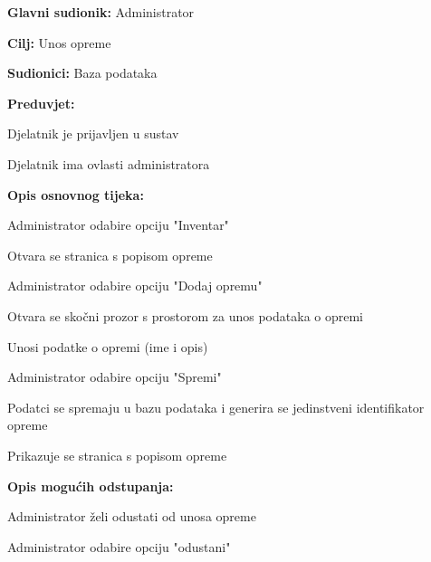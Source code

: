 					
					\noindent {}
					\begin{packed_item}
						
						\item \textbf{Glavni sudionik: }Administrator
						\item  \textbf{Cilj: }Unos opreme
							\item  \textbf{Sudionici: }Baza podataka
							\item  \textbf{Preduvjet: }
							\item[] \begin{packed_enum}
								
								\item[-] Djelatnik je prijavljen u sustav
								\item[-] Djelatnik ima ovlasti administratora
							\end{packed_enum}
							\item  \textbf{Opis osnovnog tijeka: }
							
							\item[] \begin{packed_enum}
								\item Administrator odabire opciju "Inventar"
								\item Otvara se stranica s popisom opreme
								\item Administrator odabire opciju "Dodaj opremu"
								\item Otvara se skočni prozor s prostorom za unos podataka o opremi
								\item Unosi podatke o opremi (ime i opis)
								\item Administrator odabire opciju "Spremi"
								\item Podatci se spremaju u bazu podataka i generira se jedinstveni identifikator opreme
								\item Prikazuje se stranica s popisom opreme
							\end{packed_enum}
							
							\item  \textbf{Opis mogućih odstupanja:}
							
							\item[] \begin{packed_item}
								
								\item[6.a] Administrator želi odustati od unosa opreme 
								\item[] \begin{packed_enum}
									\item 	Administrator odabire opciju "odustani"			
								\end{packed_enum}
							\end{packed_item}
						\end{packed_item}
				
